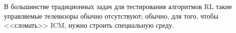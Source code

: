 \begin{remark}
В большинстве традиционных задач для тестирования алгоритмов RL такие управляемые телевизоры обычно отсутствуют; обычно, для того, чтобы <<сломать>> ICM, нужно строить специальную среду. 
\end{remark}





